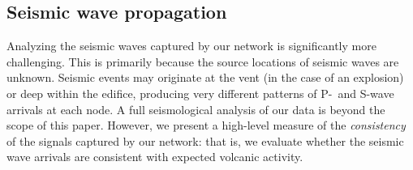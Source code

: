
\subsection{Seismic wave propagation}

Analyzing the seismic waves captured by our network is significantly more
challenging. This is primarily because the source locations of seismic waves
are unknown.  Seismic events may originate at the vent (in the case of an
explosion) or deep within the edifice, producing very different patterns of
P-~and S-wave arrivals at each node. A full seismological analysis of our
data is beyond the scope of this paper. However, we present a high-level
measure of the {\em consistency} of the signals captured by our network: that
is, we evaluate whether the seismic wave arrivals are consistent with
expected volcanic activity.


